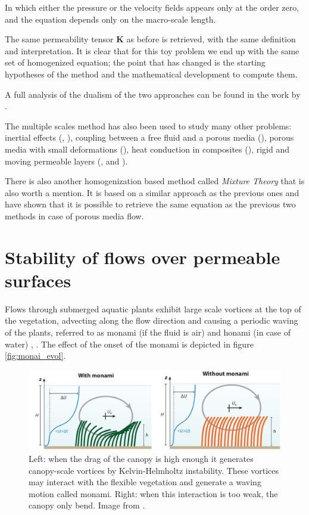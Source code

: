 In which either the pressure or the velocity fields appears only at the order zero, and the equation depends only on the macro-scale length.

The same permeability tensor $\mathbf{K}$ as before is retrieved, with the same definition and interpretation.
It is clear that for this toy problem we end up with the same set of homogenized equation; the point that has changed is the starting hypotheses of the method and the mathematical development to compute them.

A full analysis of the dualism of the two approaches can be found in the work by \citet{davit2013homogenization}.

The multiple scales method has also been used to study many other problems: inertial effects (\citet{mei1991effect}, \citet{skjetne1999new}), coupling between a free fluid and a porous media (\citet{mikelic2000interface}), porous media with small deformations (\citet{auriault1977etude}), heat conduction in composites (\citet{auriault1983effective}), rigid and moving permeable layers (\citet{zampogna2016fluid}, \citet{ugis} and \citet{zampogna2017pelskin}).

There is also another homogenization based method called \textit{Mixture Theory} that is also worth a mention.
It is based on a similar approach as the previous ones and \citet{rajagopal2007hierarchy} have shown that it is possible to retrieve the same equation as the previous two methods in case of porous media flow.


\section{Stability of flows over permeable surfaces}
\label{sec:stability}

Flows through submerged aquatic plants exhibit large scale vortices at the top of the vegetation,
advecting along the flow direction and causing a periodic waving of the plants, referred to as
monami (if the fluid is air) and honami (in case of water) \citet{inoue1955studies}, \citet{ackerman1993reduced}.
The effect of the onset of the monami is depicted in figure \ref{fig:monai_evol}.

\begin{figure}[h]
	\centering
	\includegraphics[width=1\linewidth]{chapter_1/monami}
	\caption{Left: when the drag of the canopy is high enough it generates canopy-scale vortices by Kelvin-Helmholtz instability. These vortices may interact with the flexible vegetation and generate a waving motion called monami. Right: when this interaction is too weak, the canopy only bend. Image from \citet{nepf2012flow}.}
	\label{fig:monami}
\end{figure}

